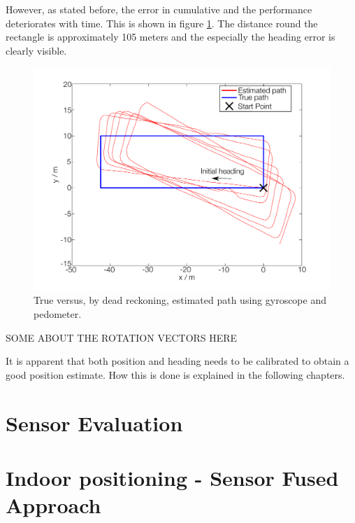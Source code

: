 \documentclass{LTHthesis}
\begin{document}
However, as stated before, the error in cumulative and the performance deteriorates with time. This is shown in figure \ref{deadreckon_2}. The distance round the rectangle is approximately 105 meters and the especially the heading error is clearly visible. 
%
\begin{figure}[!hbt]

\includegraphics[width=1\textwidth ]{images/kinematic/deadreckon_2}
\caption{True versus, by dead reckoning, estimated path using gyroscope and pedometer.}\label{deadreckon_2}
\end{figure}

SOME ABOUT THE ROTATION VECTORS HERE

It is apparent that both position and heading needs to be calibrated to obtain a good position estimate. How this is done is explained in the following chapters.
%
\chapter{Sensor Evaluation}
%
\chapter{Indoor positioning - Sensor Fused Approach} 

\printbibliography  %
\end{document}
